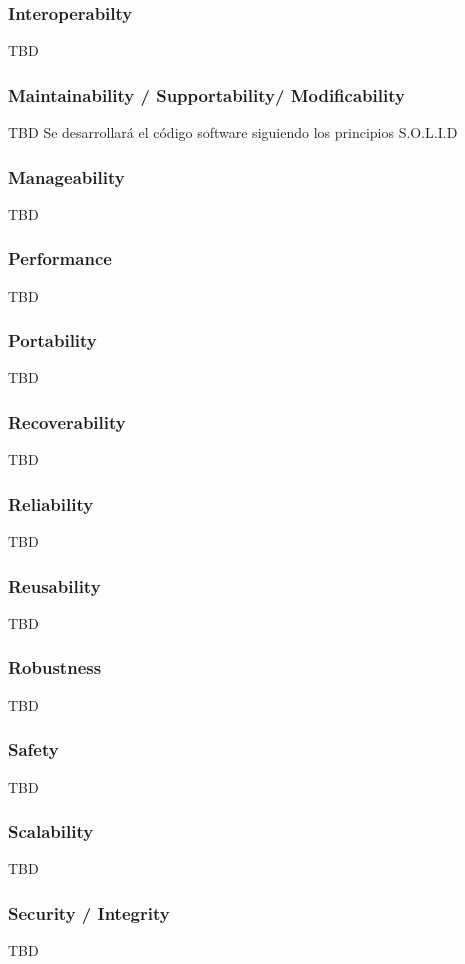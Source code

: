         \subsubsection{Interoperabilty}
            TBD
        \subsubsection{Maintainability / Supportability/ Modificability}
            TBD
            Se desarrollará el código software siguiendo los principios S.O.L.I.D

        \subsubsection{Manageability}
            TBD
        \subsubsection{Performance}
            TBD
        \subsubsection{Portability}
            TBD
        \subsubsection{Recoverability}
            TBD
        \subsubsection{Reliability}
            TBD
        \subsubsection{Reusability}
            TBD
        \subsubsection{Robustness}
            TBD
        \subsubsection{Safety}
            TBD
        \subsubsection{Scalability}
            TBD
        \subsubsection{Security / Integrity}
            TBD
